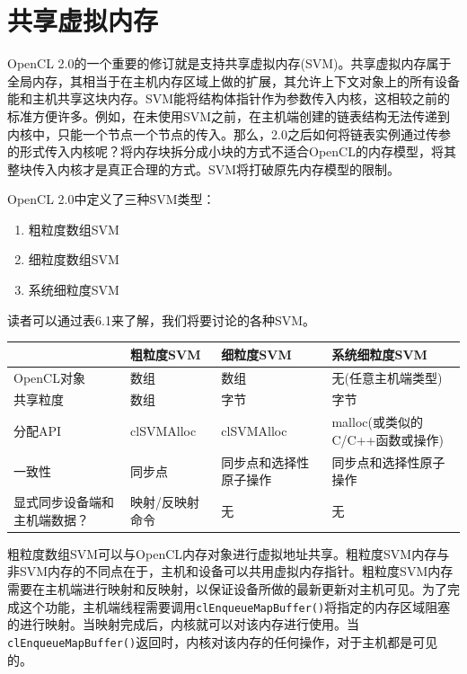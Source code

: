 \section{共享虚拟内存}

OpenCL 2.0的一个重要的修订就是支持共享虚拟内存(SVM)。共享虚拟内存属于全局内存，其相当于在主机内存区域上做的扩展，其允许上下文对象上的所有设备能和主机共享这块内存。SVM能将结构体指针作为参数传入内核，这相较之前的标准方便许多。例如，在未使用SVM之前，在主机端创建的链表结构无法传递到内核中，只能一个节点一个节点的传入。那么，2.0之后如何将链表实例通过传参的形式传入内核呢？将内存块拆分成小块的方式不适合OpenCL的内存模型，将其整块传入内核才是真正合理的方式。SVM将打破原先内存模型的限制。

OpenCL 2.0中定义了三种SVM类型：

\begin{enumerate}
\item 粗粒度数组SVM
\item 细粒度数组SVM
\item 系统细粒度SVM
\end{enumerate}

读者可以通过表6.1来了解，我们将要讨论的各种SVM。

\par\medskip\noindent
\begingroup\fontsize{9bp}{12.5bp}\selectfont\renewcommand{\arraystretch}{1.12}
\begin{center}
\begin{tabularx}{\textwidth}{XllX}
\toprule
 & 粗粒度SVM & 细粒度SVM & 系统细粒度SVM \\
\midrule
OpenCL对象 & 数组 & 数组 & 无(任意主机端类型) \\
共享粒度 & 数组 & 字节 & 字节 \\
分配API & clSVMAlloc & clSVMAlloc & malloc(或类似的C/C++函数或操作) \\
一致性 & 同步点 & 同步点和选择性原子操作 & 同步点和选择性原子操作 \\
显式同步设备端和主机端数据？ & 映射/反映射命令 & 无 & 无 \\
\bottomrule
\end{tabularx}
\end{center}
\endgroup
\medskip

粗粒度数组SVM可以与OpenCL内存对象进行虚拟地址共享。粗粒度SVM内存与非SVM内存的不同点在于，主机和设备可以共用虚拟内存指针。粗粒度SVM内存需要在主机端进行映射和反映射，以保证设备所做的最新更新对主机可见。为了完成这个功能，主机端线程需要调用\texttt{clEnqueueMapBuffer()}将指定的内存区域阻塞的进行映射。当映射完成后，内核就可以对该内存进行使用。当\texttt{clEnqueueMapBuffer()}返回时，内核对该内存的任何操作，对于主机都是可见的。

